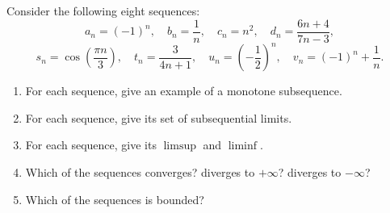 \documentclass[11pt]{scrartcl}
\providecommand{\half}{\frac{1}{2}}
\providecommand{\ii}{\item}
\theoremstyle{problem}
\newenvironment{problem}[1]
{\renewcommand\theinnercustomthm{#1}\innercustomthm}
{\endinnercustomthm}
\theoremstyle{remark}
\begin{document}
\pagebreak
\begin{problem}{11.2, 11.3}
	Consider the following eight sequences:
	\[a_n = (-1)^n,\quad b_n = \frac 1n,\quad c_n = n^2,\quad
	d_n = \frac{6n + 4}{7n - 3},\]
	\[s_n = \cos\left(\frac{\pi n}{3}\right),\quad
	t_n = \frac{3}{4n + 1},\quad u_n = \left(-\half\right)^n,
	\quad v_n = (-1)^n + \frac 1n.\]
	\begin{enumerate}[\emph{\textbf{(\alph*)}}]
		\ii For each sequence, give an example of a monotone subsequence.
		\ii For each sequence, give its set of subsequential limits.
		\ii For each sequence, give its $\limsup$ and $\liminf$.
		\ii Which of the sequences converges? diverges to $+\infty$?
		diverges to $-\infty$?
		\ii Which of the sequences is bounded?
	\end{enumerate}
\end{problem}
\end{document}
